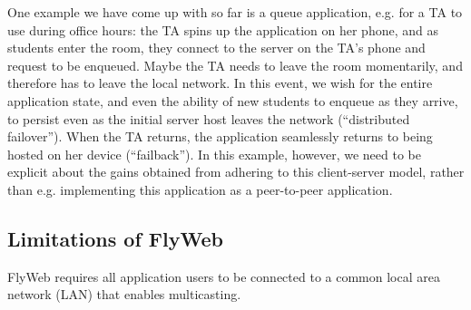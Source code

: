 One example we have come up with so far is a queue application, e.g. for a TA to use during office hours: the TA spins up the application on her phone, and as students enter the room, they connect to the server on the TA's phone and request to be enqueued. Maybe the TA needs to leave the room momentarily, and therefore has to leave the local network. In this event, we wish for the entire application state, and even the ability of new students to enqueue as they arrive, to persist even as the initial server host leaves the network (``distributed failover''). When the TA returns, the application seamlessly returns to being hosted on her device (``failback''). In this example, however, we need to be explicit about the gains obtained from adhering to this client-server model, rather than e.g. implementing this application as a peer-to-peer application.

\subsection{Limitations of FlyWeb}

FlyWeb requires all application users to be connected to a common local area network (LAN) that enables multicasting.


